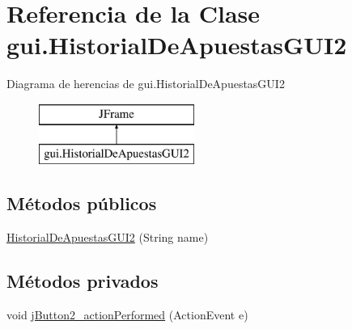 \hypertarget{classgui_1_1HistorialDeApuestasGUI2}{}\section{Referencia de la Clase gui.\+Historial\+De\+Apuestas\+G\+U\+I2}
\label{classgui_1_1HistorialDeApuestasGUI2}
Diagrama de herencias de gui.\+Historial\+De\+Apuestas\+G\+U\+I2\begin{figure}[H]
\begin{center}
\leavevmode
\includegraphics[height=2.000000cm]{classgui_1_1HistorialDeApuestasGUI2}
\end{center}
\end{figure}
\subsection*{Métodos públicos}
\begin{DoxyCompactItemize}
\item 
\mbox{\hyperlink{classgui_1_1HistorialDeApuestasGUI2_a414d7719dcd081f273de8bfcf59a46ce}{Historial\+De\+Apuestas\+G\+U\+I2}} (String name)
\end{DoxyCompactItemize}
\subsection*{Métodos privados}
\begin{DoxyCompactItemize}
\item 
void \mbox{\hyperlink{classgui_1_1HistorialDeApuestasGUI2_a9cbec6c4b294115cf083b72a01add9a1}{j\+Button2\+\_\+action\+Performed}} (Action\+Event e)
\end{DoxyCompactItemize}
